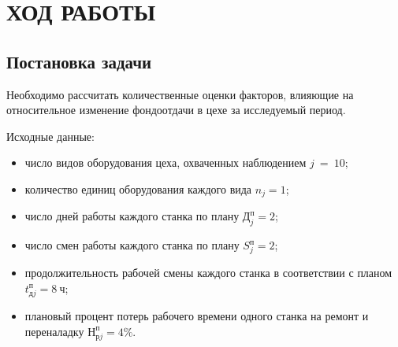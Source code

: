 \section{ХОД РАБОТЫ}

\subsection{Постановка задачи}

Необходимо рассчитать количественные оценки факторов, влияющие
на относительное изменение фондоотдачи в цехе за исследуемый период.

Исходные данные:

\begin{itemize}
  \item число видов оборудования цеха, охваченных наблюдением $ j~=~10 $;
  \item количество единиц оборудования каждого вида $ n_j = 1$;
  \item число дней работы каждого станка по плану $ \text{Д}_j^{\text{п}} = 2 $;
  \item число смен работы каждого станка по плану $ S^\text{п}_j = 2 $;
  \item продолжительность рабочей смены каждого станка в соответствии
    с планом $ t^\text{п}_{\text{д}j} = 8\>\text{ч}$;
  \item плановый процент потерь рабочего времени одного станка на ремонт и
    переналадку $ \text{Н}^\text{п}_{\text{р}j} = 4 \%$.
\end{itemize}

